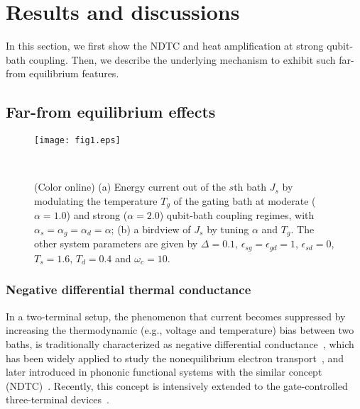 \documentclass[twocolumn,preprintnumbers,amsmath,amssymb]{revtex4}
\begin{document}
\section{Results and discussions}
In this section, we first show the NDTC and heat amplification at strong qubit-bath coupling.
Then, we describe the underlying mechanism to exhibit such far-from equilibrium features.


\subsection{Far-from equilibrium effects}

\begin{figure}[tbp]
\texttt{[image: fig1.eps]}
\caption{(Color online) (a) Energy current out of the $s$th bath $J_s$ by modulating the temperature $T_g$ of the gating bath
at moderate ($\alpha=1.0$) and strong ($\alpha=2.0$) qubit-bath coupling regimes, with $\alpha_s=\alpha_g=\alpha_d=\alpha$;
(b) a birdview of $J_s$ by tuning $\alpha$ and $T_g$.
The other system parameters are given by $\Delta=0.1$, $\epsilon_{sg}=\epsilon_{gd}=1$, $\epsilon_{sd}=0$, $T_s=1.6$, $T_d=0.4$ and $\omega_c=10$.
}~\label{fig1}
\end{figure}

\subsubsection{Negative differential thermal conductance}

In a two-terminal setup, the phenomenon that current becomes suppressed by increasing the thermodynamic (e.g., voltage and temperature) bias between two baths, is traditionally characterized as negative differential conductance~\cite{oaluf2012}, which has been widely applied to study the nonequilibrium electron transport~\cite{mgalperin2005nl},
and later introduced in phononic functional systems with the similar concept (NDTC)~\cite{dvirasegal2006prb,bli2006apl}.
Recently, this concept is intensively extended to the gate-controlled three-terminal devices~\cite{nbli2012rmp,acsnano2012yqwu,prl2014pbabdallah,kjoulain2016prl}.
\end{document}

